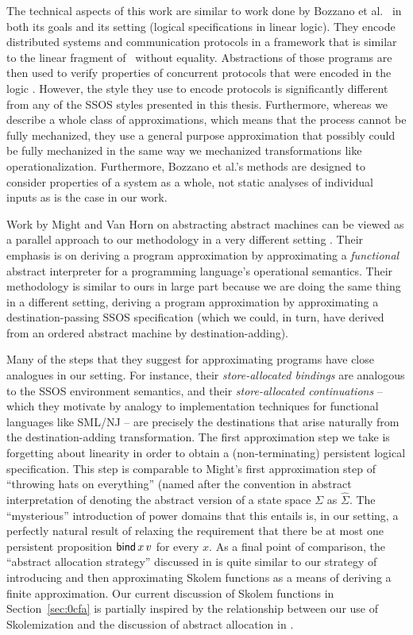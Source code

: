 The technical aspects of this work are similar to work done by Bozzano
et al.~\cite{cite,cite} in both its goals and its setting (logical
specifications in linear logic). They encode distributed systems and
communication protocols in a framework that is similar to the linear
fragment of \sls~without equality. Abstractions of those programs are
then used to verify properties of concurrent protocols that were
encoded in the logic \cite{cite}. However, the style they use to
encode protocols is significantly different from any of the SSOS
styles presented in this thesis. Furthermore, whereas we describe a
whole class of approximations, which means that the process cannot be
fully mechanized, they use a general purpose approximation that
possibly could be fully mechanized in the same way we mechanized
transformations like operationalization. Furthermore, Bozzano et
al.'s methods are designed to consider properties of a system as a
whole, not static analyses of individual inputs as is the case in our
work.


Work by Might and Van Horn on abstracting abstract machines can be
viewed as a parallel approach to our methodology in a very different
setting \cite{cite,cite,cite}. Their emphasis is on deriving a program
approximation by approximating a {\it functional} abstract interpreter
for a programming language's operational semantics. Their methodology
is similar to ours in large part because we are doing the same thing in
a different setting, deriving a program approximation by approximating
a destination-passing SSOS specification (which we could, in turn, have
derived from an ordered abstract machine by destination-adding).

Many of the steps that they suggest for approximating programs have
close analogues in our setting. For instance, their {\it
  store-allocated bindings} are analogous to the SSOS environment
semantics, and their {\it store-allocated continuations} -- which they
motivate by analogy to implementation techniques for functional
languages like SML/NJ -- are precisely the destinations that arise
naturally from the destination-adding transformation. The first
approximation step we take is forgetting about linearity in order to
obtain a (non-terminating) persistent logical specification. This step
is comparable to Might's first approximation step of ``throwing hats
on everything'' (named after the convention in abstract interpretation
of denoting the abstract version of a state space $\Sigma$ as
$\hat{\Sigma}$. The ``mysterious'' introduction of power domains that
this entails is, in our setting, a perfectly natural result of
relaxing the requirement that there be at most one persistent
proposition ${\sf bind}\,x\,v$ for every $x$. As a final point of
comparison, the ``abstract allocation strategy'' discussed in
\cite{cite} is quite similar to our strategy of introducing and then
approximating Skolem functions as a means of deriving a finite
approximation. Our current discussion of Skolem functions in
Section~\ref{sec:0cfa} is partially inspired by the relationship
between our use of Skolemization and the discussion of abstract
allocation in \cite{cite}.

